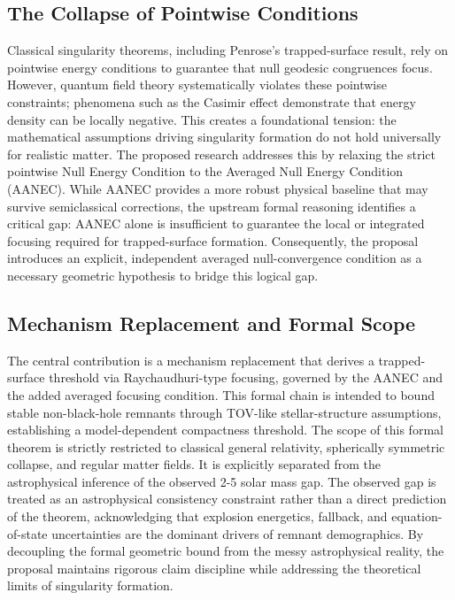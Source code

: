 \documentclass[conference]{IEEEtran}
\begin{document}
\subsection{The Collapse of Pointwise Conditions}
Classical singularity theorems, including Penrose's trapped-surface result, rely on pointwise energy conditions to guarantee that null geodesic congruences focus. However, quantum field theory systematically violates these pointwise constraints; phenomena such as the Casimir effect demonstrate that energy density can be locally negative. This creates a foundational tension: the mathematical assumptions driving singularity formation do not hold universally for realistic matter. The proposed research addresses this by relaxing the strict pointwise Null Energy Condition to the Averaged Null Energy Condition (AANEC). While AANEC provides a more robust physical baseline that may survive semiclassical corrections, the upstream formal reasoning identifies a critical gap: AANEC alone is insufficient to guarantee the local or integrated focusing required for trapped-surface formation. Consequently, the proposal introduces an explicit, independent averaged null-convergence condition as a necessary geometric hypothesis to bridge this logical gap.~\cite{cite_0ed84243cf171bc4}

\subsection{Mechanism Replacement and Formal Scope}
The central contribution is a mechanism replacement that derives a trapped-surface threshold via Raychaudhuri-type focusing, governed by the AANEC and the added averaged focusing condition. This formal chain is intended to bound stable non-black-hole remnants through TOV-like stellar-structure assumptions, establishing a model-dependent compactness threshold. The scope of this formal theorem is strictly restricted to classical general relativity, spherically symmetric collapse, and regular matter fields. It is explicitly separated from the astrophysical inference of the observed 2-5 solar mass gap. The observed gap is treated as an astrophysical consistency constraint rather than a direct prediction of the theorem, acknowledging that explosion energetics, fallback, and equation-of-state uncertainties are the dominant drivers of remnant demographics. By decoupling the formal geometric bound from the messy astrophysical reality, the proposal maintains rigorous claim discipline while addressing the theoretical limits of singularity formation.~\cite{cite_7a407c865faafd11,cite_c369df652181e8f7}
\end{document}
